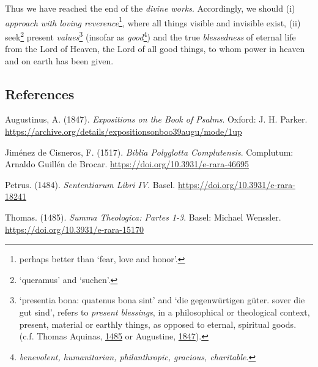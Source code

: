 \documentclass[
]{article}
\begin{document}
Thus we have reached the end of the \emph{divine works}. Accordingly, we
should (i) \emph{approach with loving reverence}\footnote{perhaps better
  than `fear, love and honor'.}, where all things visible and invisible
exist, (ii) seek\footnote{`queramus' and `suchen'.} present
\emph{values}\footnote{`presentia bona: quatenus bona sint' and `die
  gegenwürtigen güter. sover die gut sind', refers to \emph{present
  blessings}, in a philosophical or theological context, present,
  material or earthly things, as opposed to eternal, spiritual goods.
  (c.f. Thomas Aquinas,
  \href{https://doi.org/10.3931/e-rara-15170}{1485} or Augustine,
  \href{https://archive.org/details/expositionsonboo39augu/mode/1up}{1847}).}
(insofar as \emph{good}\footnote{\emph{benevolent, humanitarian,
  philanthropic, gracious, charitable}.}) and the true
\emph{blessedness} of eternal life from the Lord of Heaven, the Lord of
all good things, to whom power in heaven and on earth has been given.

\hypertarget{references}{%
\subsection{References}\label{references}}

Augustinus, A. (1847). \emph{Expositions on the Book of Psalms}. Oxford:
J. H. Parker.
\url{https://archive.org/details/expositionsonboo39augu/mode/1up}

Jiménez de Cisneros, F. (1517). \emph{Biblia Polyglotta Complutensis}.
Complutum: Arnaldo Guillén de Brocar.
\url{https://doi.org/10.3931/e-rara-46695}

Petrus. (1484). \emph{Sententiarum Libri IV}. Basel.
\url{https://doi.org/10.3931/e-rara-18241}

Thomas. (1485). \emph{Summa Theologica: Partes 1-3}. Basel: Michael
Wenssler. \url{https://doi.org/10.3931/e-rara-15170}
\end{document}
